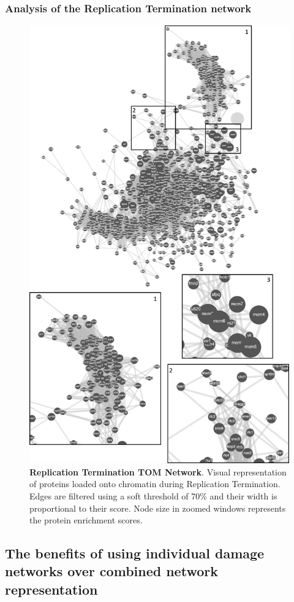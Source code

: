 \subsubsection{Analysis of the Replication Termination network}
\begin{figure}[H]
    \centering
    \includegraphics[width=.7\textwidth]{resources/images/Results/RT_networkplot.png}
    \caption[Replication Termination TOM Network]{\textbf{Replication Termination TOM Network}. Visual representation of proteins loaded onto chromatin during Replication Termination. Edges are filtered using a soft threshold of 70\% and their width  is proportional to their score. Node size in zoomed windows represents the protein enrichment scores.}
    \label{fig:RTtom}
\end{figure}

\subsection{The benefits of using individual damage networks over combined network representation}

